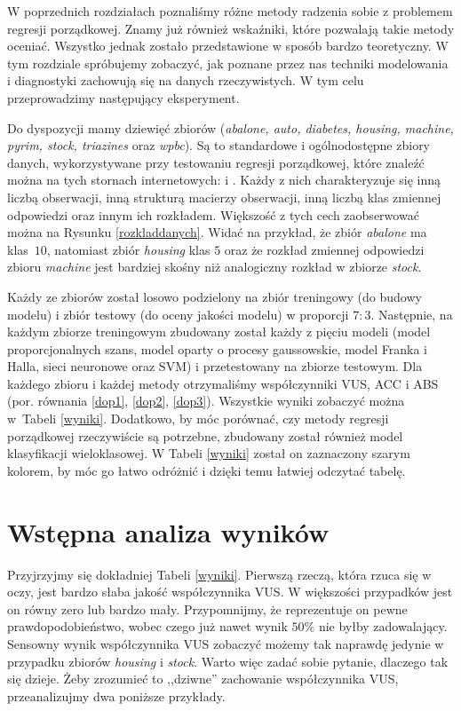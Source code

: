 \documentclass{mini}
\begin{document}
W poprzednich rozdziałach poznaliśmy różne metody radzenia sobie z problemem regresji porządkowej. Znamy już również wskaźniki, które pozwalają takie metody oceniać. Wszystko jednak zostało przedstawione w sposób bardzo teoretyczny. W tym rozdziale spróbujemy zobaczyć, jak poznane przez nas techniki modelowania i diagnostyki zachowują się na danych rzeczywistych. W tym celu przeprowadzimy następujący eksperyment.

Do dyspozycji mamy dziewięć zbiorów (\textit{abalone, auto, diabetes, housing, machine, pyrim, stock, triazines} oraz \textit{wpbc}). Są to standardowe i ogólnodostępne zbiory danych, wykorzystywane przy testowaniu regresji porządkowej, które znaleźć można na tych stornach internetowych: \cite{zbiorki} i \cite{zbiorki2}. Każdy z nich charakteryzuje się inną liczbą obserwacji, inną strukturą macierzy obserwacji, inną liczbą klas zmiennej odpowiedzi oraz innym ich rozkładem. Większość z tych cech zaobserwować można na Rysunku \ref{rozkladdanych}. Widać na przykład, że zbiór \textit{abalone} ma klas~$10$, natomiast zbiór \textit{housing} klas $5$ oraz że rozkład zmiennej odpowiedzi zbioru \textit{machine} jest bardziej skośny niż analogiczny rozkład w zbiorze \textit{stock}. 

Każdy ze zbiorów został losowo podzielony na zbiór treningowy (do budowy modelu) i zbiór testowy (do oceny jakości modelu) w proporcji $7:3$. Następnie, na każdym zbiorze treningowym zbudowany został każdy z pięciu modeli (model proporcjonalnych szans, model oparty o procesy gaussowskie, model Franka i Halla, sieci neuronowe oraz SVM) i przetestowany na zbiorze testowym. Dla każdego zbioru i każdej metody otrzymaliśmy współczynniki VUS, ACC i ABS (por. równania \eqref{dop1}, \eqref{dop2}, \eqref{dop3}). Wszystkie wyniki zobaczyć można w~Tabeli \ref{wyniki}. Dodatkowo, by móc porównać, czy metody regresji porządkowej rzeczywiście są potrzebne, zbudowany został również model klasyfikacji wieloklasowej. W Tabeli \ref{wyniki} został on zaznaczony szarym kolorem, by móc go łatwo odróżnić i dzięki temu łatwiej odczytać tabelę.

\section{Wstępna analiza wyników}

Przyjrzyjmy się dokładniej Tabeli \ref{wyniki}. Pierwszą rzeczą, która rzuca się w oczy, jest bardzo słaba jakość współczynnika VUS. W większości przypadków jest on równy zero lub bardzo mały. Przypomnijmy, że reprezentuje on pewne prawdopodobieństwo, wobec czego już nawet wynik $50\%$ nie byłby zadowalający. Sensowny wynik współczynnika VUS zobaczyć możemy tak naprawdę jedynie w przypadku zbiorów \textit{housing} i \textit{stock}. Warto więc zadać sobie pytanie, dlaczego tak się dzieje.  Żeby zrozumieć to ,,dziwne'' zachowanie współczynnika VUS, przeanalizujmy dwa poniższe przykłady.
\end{document}
